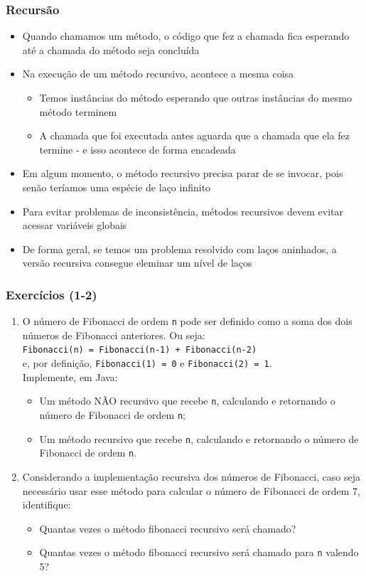 \documentclass[xcolor={dvipsnames,table},aspectratio=169]{beamer}
\begin{document}
\begin{frame}[fragile]\frametitle{Recursão}
\begin{itemize}
    \item Quando chamamos um método, o código que fez a chamada fica esperando até a chamada do método seja concluída
    \item Na execução de um método recursivo, acontece a mesma coisa
    \begin{itemize}
        \item Temos instâncias do método esperando que outras instâncias do mesmo método terminem
        \item A chamada que foi executada antes aguarda que a chamada que ela fez termine - e isso acontece de forma encadeada
    \end{itemize}
    \item Em algum momento, o método recursivo precisa parar de se invocar, pois senão teríamos uma espécie de laço infinito
    \item Para evitar problemas de inconsistência, métodos recursivos devem evitar acessar variáveis globais
    \item De forma geral, se temos um problema resolvido com laços aninhados, a versão recursiva consegue eleminar um nível de laços
\end{itemize}
\end{frame}

\begin{frame}\frametitle{Exercícios (1-2)}
\begin{enumerate}
	\item O número de Fibonacci de ordem \texttt{n} pode ser definido como a soma dos dois números de Fibonacci anteriores. Ou seja:\\
\texttt{Fibonacci(n) = Fibonacci(n-1) + Fibonacci(n-2)}\\
e, por definição, \texttt{Fibonacci(1) = 0} e \texttt{Fibonacci(2) = 1}.\\
Implemente, em Java:
\begin{itemize}
\item Um método NÃO recursivo que recebe \texttt{n}, calculando e retornando o número de Fibonacci de ordem \texttt{n};
\item Um método recursivo que recebe \texttt{n}, calculando e retornando o número de Fibonacci de ordem \texttt{n}.
\end{itemize}
	\item Considerando a implementação recursiva dos números de Fibonacci,  caso seja necessário usar esse método para calcular o número de Fibonacci de ordem 7, identifique:
\begin{itemize}
\item Quantas vezes o método fibonacci recursivo será chamado?
\item Quantas vezes o método fibonacci recursivo será chamado para \texttt{n} valendo 5?
\end{itemize}
\end{enumerate}
\end{frame}
\end{document}
